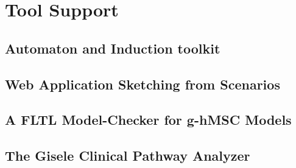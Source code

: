 \chapter{Tool Support\label{chapter:tool-support}}

\section{Automaton and Induction toolkit}

\section{Web Application Sketching from Scenarios}

\section{A FLTL Model-Checker for g-hMSC Models}

\section{The Gisele Clinical Pathway Analyzer}
